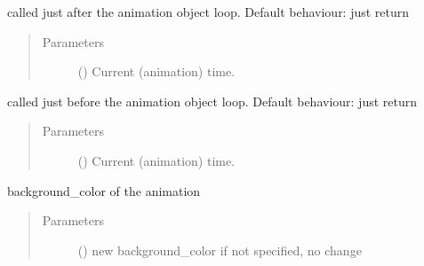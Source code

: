 \documentclass[letterpaper,10pt,english]{sphinxmanual}
\begin{document}
\begin{fulllineitems}
\begin{fulllineitems}
\end{fulllineitems}


\begin{fulllineitems}
\label{\detokenize{Reference:salabim.Environment.animation_post_tick}}
called just after the animation object loop. 
Default behaviour: just return
\begin{quote}\begin{description}
\item[{Parameters}] \leavevmode
{} () \textendash{} Current (animation) time.

\end{description}\end{quote}

\end{fulllineitems}


\begin{fulllineitems}
\label{\detokenize{Reference:salabim.Environment.animation_pre_tick}}
called just before the animation object loop. 
Default behaviour: just return
\begin{quote}\begin{description}
\item[{Parameters}] \leavevmode
{} () \textendash{} Current (animation) time.

\end{description}\end{quote}

\end{fulllineitems}


\begin{fulllineitems}
\label{\detokenize{Reference:salabim.Environment.background_color}}
background\_color of the animation
\begin{quote}\begin{description}
\item[{Parameters}] \leavevmode
{} () \textendash{} new background\_color 
if not specified, no change


\end{description}
\end{quote}
\end{fulllineitems}
\end{fulllineitems}
\end{document}

